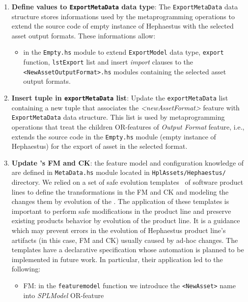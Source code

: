 \begin{enumerate}
  \item \textbf{Define values to \texttt{ExportMetaData} data type}: The \texttt{ExportMetaData} data structure stores informations used by the metaprogramming operations to extend the source code of empty instance of Hephaestus with the selected asset output formats. These informations allow:

\begin{itemize}

\item in the \texttt{Empty.hs} module to extend \texttt{ExportModel} data type, \texttt{export} function, \texttt{lstExport} list and insert \textit{import} clauses to the \texttt{<NewAssetOutputFormat>.hs} modules containing the selected asset output formats.

\end{itemize}

  \item \textbf{Insert tuple in \texttt{exportMetaData} list}: Update the \texttt{exportMetaData} list containing a new tuple that associates the \textit{<newAssetFormat>} feature with \texttt{ExportMetaData} data structure. This list is used by metaprogramming operations that treat the children OR-features of \textit{Output Format} feature, i.e., extends the source code in the \texttt{Empty.hs} module (empty instance of Hephaestus) for the export of asset in the selected format.
  
  \item \textbf{Update \hpl's FM and CK}: the feature model and configuration knowledge of \hpl{} are defined in \texttt{MetaData.hs} module located in \texttt{HplAssets/Hephaestus/} directory. We relied on a set of safe evolution templates~\cite{DBLP:conf/gpce/NevesTSAKB11} of software product lines to define the transformations in the FM and CK and modeling the changes them by evolution of the \hpl. The application of these templates is important to perform safe modifications in the product line and preserve existing products behavior by evolution of the product line. It is a guidance which may prevent errors in the evolution of Hephaestus product line's artifacts (in this case, FM and CK) usually caused by ad-hoc changes. The templates have a declarative specification whose automation is planned to be implemented in future work. In particular, their application led to the following:

\begin{itemize}
\item FM: in the \texttt{featuremodel} function we introduce the \texttt{<NewAsset>} name into \textit{SPLModel} OR-feature


\end{itemize}
\end{enumerate}
